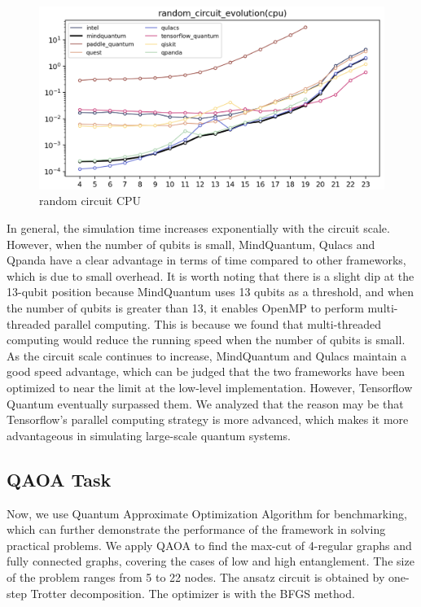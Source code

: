 \begin{figure}[htbp]
    \begin{center}
        \includegraphics[width=0.7\linewidth]{7_figures/random_circuit_CPU.png}
    \end{center}
    \caption{random circuit CPU}
\end{figure}

In general, the simulation time increases exponentially with the circuit scale. However, when the number of qubits is small, MindQuantum, Qulacs and Qpanda have a clear advantage in terms of time compared to other frameworks, which is due to small overhead. It is worth noting that there is a slight dip at the 13-qubit position because MindQuantum uses 13 qubits as a threshold, and when the number of qubits is greater than 13, it enables OpenMP to perform multi-threaded parallel computing. This is because we found that multi-threaded computing would reduce the running speed when the number of qubits is small. As the circuit scale continues to increase, MindQuantum and Qulacs maintain a good speed advantage, which can be judged that the two frameworks have been optimized to near the limit at the low-level implementation. However, Tensorflow Quantum eventually surpassed them. We analyzed that the reason may be that Tensorflow’s parallel computing strategy is more advanced, which makes it more advantageous in simulating large-scale quantum systems.

\subsection{QAOA Task}

Now, we use Quantum Approximate Optimization Algorithm for benchmarking, which can further demonstrate the performance of the framework in solving practical problems. We apply QAOA to find the max-cut of 4-regular graphs and fully connected graphs, covering the cases of low and high entanglement. The size of the problem ranges from 5 to 22 nodes. The ansatz circuit is obtained by one-step Trotter decomposition. The optimizer is  with the BFGS method.

